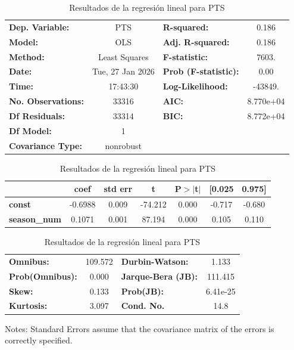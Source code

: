 \begin{table}[H]
\centering
\caption{Resultados de la regresión lineal para PTS}
\label{tab:reg-pts}
\begin{center}
\begin{tabular}{lclc}
\toprule
\textbf{Dep. Variable:}    &       PTS        & \textbf{  R-squared:         } &     0.186   \\
\textbf{Model:}            &       OLS        & \textbf{  Adj. R-squared:    } &     0.186   \\
\textbf{Method:}           &  Least Squares   & \textbf{  F-statistic:       } &     7603.   \\
\textbf{Date:}             & Tue, 27 Jan 2026 & \textbf{  Prob (F-statistic):} &     0.00    \\
\textbf{Time:}             &     17:43:30     & \textbf{  Log-Likelihood:    } &   -43849.   \\
\textbf{No. Observations:} &       33316      & \textbf{  AIC:               } & 8.770e+04   \\
\textbf{Df Residuals:}     &       33314      & \textbf{  BIC:               } & 8.772e+04   \\
\textbf{Df Model:}         &           1      & \textbf{                     } &             \\
\textbf{Covariance Type:}  &    nonrobust     & \textbf{                     } &             \\
\bottomrule
\end{tabular}
\begin{tabular}{lcccccc}
                     & \textbf{coef} & \textbf{std err} & \textbf{t} & \textbf{P$> |$t$|$} & \textbf{[0.025} & \textbf{0.975]}  \\
\midrule
\textbf{const}       &      -0.6988  &        0.009     &   -74.212  &         0.000        &       -0.717    &       -0.680     \\
\textbf{season\_num} &       0.1071  &        0.001     &    87.194  &         0.000        &        0.105    &        0.110     \\
\bottomrule
\end{tabular}
\begin{tabular}{lclc}
\textbf{Omnibus:}       & 109.572 & \textbf{  Durbin-Watson:     } &    1.133  \\
\textbf{Prob(Omnibus):} &   0.000 & \textbf{  Jarque-Bera (JB):  } &  111.415  \\
\textbf{Skew:}          &   0.133 & \textbf{  Prob(JB):          } & 6.41e-25  \\
\textbf{Kurtosis:}      &   3.097 & \textbf{  Cond. No.          } &     14.8  \\
\bottomrule
\end{tabular}
\end{center}

Notes: \newline
 [1] Standard Errors assume that the covariance matrix of the errors is correctly specified.\end{table}
